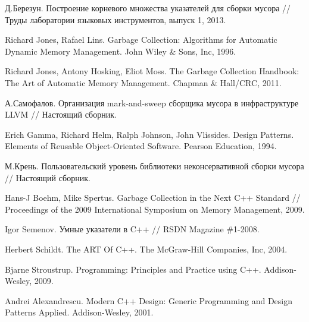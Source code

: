 % 
% 

\begin{thebibliography}{9001}

 Д.Березун. Построение корневого множества указателей для сборки мусора
// Труды лаборатории языковых инструментов, выпуск 1, 2013.

 Richard Jones, Rafael Lins. Garbage Collection: Algorithms for Automatic Dynamic Memory Management.
John Wiley \& Sons, Inc, 1996.

 Richard Jones, Antony Hosking, Eliot Moss. The Garbage Collection Handbook: The Art of Automatic Memory Management. Chapman \& Hall/CRC, 2011.

 А.Самофалов. Организация mark-and-sweep сборщика мусора в инфраструктуре LLVM // Настоящий сборник.

 Erich Gamma, Richard Helm, Ralph Johnson, John Vlissides. Design Patterns. Elements of Reusable Object-Oriented Software. Pearson Education, 1994.

 М.Крень. Пользовательский уровень библиотеки неконсервативной сборки мусора //
Настоящий сборник.

 Hans-J Boehm, Mike Spertus. Garbage Collection in the Next C++ Standard //
Proceedings of the 2009 International Symposium on Memory Management, 2009.

 Igor Semenov. Умные указатели в C++ // RSDN Magazine \#1-2008.

 Herbert Schildt. The ART Of C++. The McGraw-Hill Companies, Inc, 2004.

 Bjarne Stroustrup. Programming: Principles and Practice using C++. Addison-Wesley, 2009.

 Andrei Alexandrescu. Modern C++ Design: Generic Programming and Design Patterns Applied. Addison-Wesley, 2001.
\end{thebibliography}
